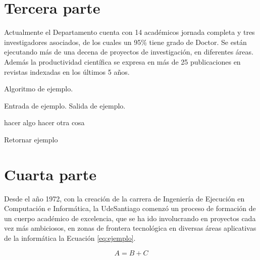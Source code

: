 \section{Tercera parte}
\label{sec:tercera}
Actualmente el Departamento cuenta con 14 académicos jornada completa y tres investigadores asociados, de los cuales un 95\% tiene grado de Doctor. Se están ejecutando más de una decena de proyectos de investigación, en diferentes áreas. Además la productividad científica se expresa en más de 25 publicaciones en revistas indexadas en los últimos 5 años.

\begin{algorithm}[!ht]
	\caption{Algoritmo de ejemplo.}
	\label{alg:ejemplo}
	\begin{algorithmic}[1]
	\REQUIRE Entrada de ejemplo.
	\ENSURE Salida de ejemplo.	
	
		\STATE hacer algo
	\ELSE
		\STATE hacer otra cosa
	\ENDIF
	
	\RETURN Retornar ejemplo
	
	\end{algorithmic}
\end{algorithm}

\section{Cuarta parte}
\label{sec:cuarta}
Desde el año 1972, con la creación de la carrera de Ingeniería de Ejecución en Computación e Informática, la UdeSantiago comenzó un proceso  de formación de un cuerpo académico de excelencia, que se ha ido involucrando en proyectos cada vez más ambiciosos, en zonas de frontera tecnológica en diversas áreas aplicativas de la informática la Ecuación \ref{eq:ejemplo}.

\begin{equation}
	A = B + C
\label{eq:ejemplo}
\end{equation}

